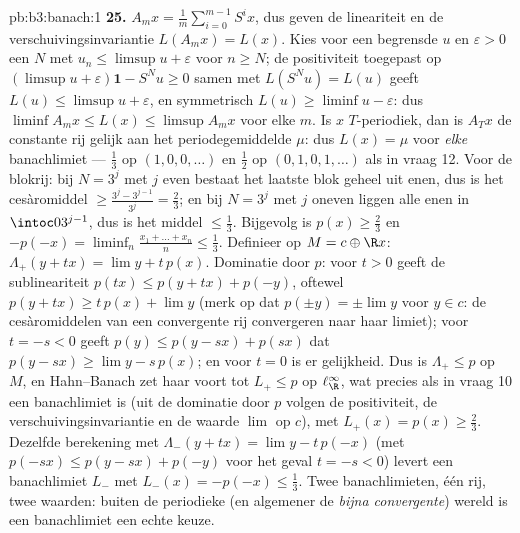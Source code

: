 \begin{solution}{pb:b3:banach:1}
\textbf{25.} $A_mx = \frac1m\sum_{i=0}^{m-1}S^ix$, dus geven de
lineariteit en de verschuivingsinvariantie $L(A_mx) = L(x)$. Kies
voor een begrensde $u$ en $\varepsilon > 0$ een $N$ met $u_n \leq
\limsup u + \varepsilon$ voor $n \geq N$; de positiviteit
toegepast op $(\limsup u + \varepsilon)\mathbf 1 - S^Nu \geq 0$
samen met $L(S^Nu) = L(u)$ geeft $L(u) \leq \limsup u +
\varepsilon$, en symmetrisch $L(u) \geq \liminf u - \varepsilon$:
dus $\liminf A_mx \leq L(x) \leq \limsup A_mx$ voor elke $m$. Is
$x$ $T$-periodiek, dan is $A_Tx$ de constante rij gelijk aan het
periodegemiddelde $\mu$: dus $L(x) = \mu$ voor \emph{elke}
banachlimiet --- $\frac13$ op $(1,0,0,\dots)$ en $\frac12$ op
$(0,1,0,1,\dots)$ als in vraag 12. Voor de blokrij: bij $N = 3^j$
met $j$ even bestaat het laatste blok geheel uit enen, dus is het
cesàromiddel $\geq \frac{3^j - 3^{j-1}}{3^j} = \frac23$; en bij $N
= 3^j$ met $j$ oneven liggen alle enen in $\intoc0{3^{j-1}}$, dus
is het middel $\leq \frac13$. Bijgevolg is $p(x) \geq \frac23$ en
$-p(-x) = \liminf_n\frac{x_1 + \dots + x_n}n \leq \frac13$.
Definieer op $M = c \oplus \R x$: $\Lambda_+(y + tx) = \lim y +
t\,p(x)$. Dominatie door $p$: voor $t > 0$ geeft de sublineariteit
$p(tx) \leq p(y + tx) + p(-y)$, oftewel $p(y + tx) \geq t\,p(x) +
\lim y$ (merk op dat $p(\pm y) = \pm\lim y$ voor $y \in c$: de
cesàromiddelen van een convergente rij convergeren naar haar
limiet); voor $t = -s < 0$ geeft $p(y) \leq p(y - sx) + p(sx)$ dat
$p(y - sx) \geq \lim y - s\,p(x)$; en voor $t = 0$ is er
gelijkheid. Dus is $\Lambda_+ \leq p$ op $M$, en Hahn--Banach zet
haar voort tot $L_+ \leq p$ op $\ell^\infty_\R$, wat precies als
in vraag 10 een banachlimiet is (uit de dominatie door $p$ volgen
de positiviteit, de verschuivingsinvariantie en de waarde $\lim$
op $c$), met $L_+(x) = p(x) \geq \frac23$. Dezelfde berekening met
$\Lambda_-(y + tx) = \lim y - t\,p(-x)$ (met $p(-sx) \leq p(y -
sx) + p(-y)$ voor het geval $t = -s < 0$) levert een banachlimiet
$L_-$ met $L_-(x) = -p(-x) \leq \frac13$. Twee banachlimieten, één
rij, twee waarden: buiten de periodieke (en algemener de
\emph{bijna convergente}) wereld is een banachlimiet een echte
keuze.
\end{solution}
